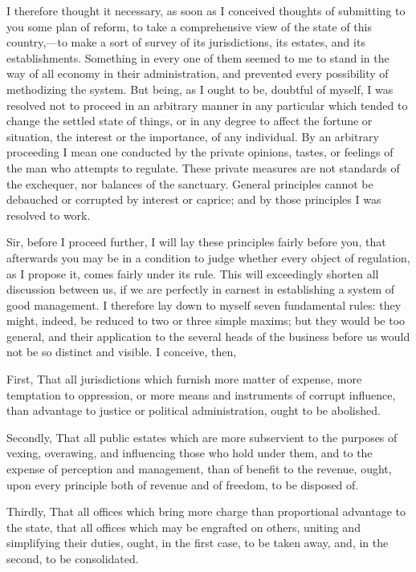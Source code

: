 I therefore thought it necessary, as soon as I conceived thoughts of submitting to you some plan of reform, to take a comprehensive view of the state of this country,—to make a sort of survey of its jurisdictions, its estates, and its establishments. Something in every one of them seemed to me to stand in the way of all economy in their administration, and prevented every possibility of methodizing the system. But being, as I ought to be, doubtful of myself, I was resolved not to proceed in an arbitrary manner in any particular which tended to change the settled state of things, or in any degree to affect the fortune or situation, the interest or the importance, of any individual. By an arbitrary proceeding I mean one conducted by the private opinions, tastes, or feelings of the man who attempts to regulate. These private measures are not standards of the exchequer, nor balances of the sanctuary. General principles cannot be debauched or corrupted by interest or caprice; and by those principles I was resolved to work.

Sir, before I proceed further, I will lay these principles fairly before you, that afterwards you may be in a condition to judge whether every object of regulation, as I propose it, comes fairly under its rule. This will exceedingly shorten all discussion between us, if we are perfectly in earnest in establishing a system of good management. I therefore lay down to myself seven fundamental rules: they might, indeed, be reduced to two or three simple maxims; but they would be too general, and their application to the several heads of the business before us would not be so distinct and visible. I conceive, then,

First, That all jurisdictions which furnish more matter of expense, more temptation to oppression, or more means and instruments of corrupt influence, than advantage to justice or political administration, ought to be abolished.

Secondly, That all public estates which are more subservient to the purposes of vexing, overawing, and influencing those who hold under them, and to the expense of perception and management, than of benefit to the revenue, ought, upon every principle both of revenue and of freedom, to be disposed of.

Thirdly, That all offices which bring more charge than proportional advantage to the state, that all offices which may be engrafted on others, uniting and simplifying their duties, ought, in the first case, to be taken away, and, in the second, to be consolidated.

